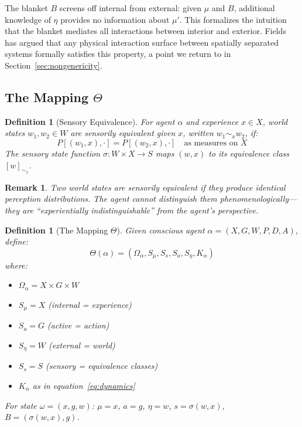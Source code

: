 \documentclass[11pt,a4paper]{article}
\newtheorem{definition}[theorem]{Definition}
\newtheorem*{remark}{Remark}
\begin{document}
The blanket $B$ screens off internal from external: given $\mu$ and $B$, additional knowledge of $\eta$ provides no information about $\mu'$. This formalizes the intuition that the blanket mediates all interactions between interior and exterior. Fields \cite{fields2019} has argued that any physical interaction surface between spatially separated systems formally satisfies this property, a point we return to in Section~\ref{sec:nongenericity}.

\subsection{The Mapping $\Theta$}

\begin{definition}[Sensory Equivalence]\label{def:sensory-equiv}
For agent $\alpha$ and experience $x \in X$, world states $w_1, w_2 \in W$ are \emph{sensorily equivalent given $x$}, written $w_1 \sim_x w_2$, if:
\[
P[(w_1, x), \cdot] = P[(w_2, x), \cdot] \quad \text{as measures on } X
\]
The \emph{sensory state function} $\sigma : W \times X \to S$ maps $(w, x)$ to its equivalence class $[w]_{\sim_x}$.
\end{definition}

\begin{remark}
Two world states are sensorily equivalent if they produce identical perception distributions. The agent cannot distinguish them phenomenologically---they are ``experientially indistinguishable'' from the agent's perspective.
\end{remark}

\begin{definition}[The Mapping $\Theta$]\label{def:theta}
Given conscious agent $\alpha = (X, G, W, P, D, A)$, define:
\[
\Theta(\alpha) = (\Omega_\alpha, S_\mu, S_s, S_a, S_\eta, K_\alpha)
\]
where:
\begin{itemize}[nosep]
    \item $\Omega_\alpha = X \times G \times W$
    \item $S_\mu = X$ (internal = experience)
    \item $S_a = G$ (active = action)
    \item $S_\eta = W$ (external = world)
    \item $S_s = S$ (sensory = equivalence classes)
    \item $K_\alpha$ as in equation~\eqref{eq:dynamics}
\end{itemize}
For state $\omega = (x, g, w)$: $\mu = x$, $a = g$, $\eta = w$, $s = \sigma(w, x)$, $B = (\sigma(w, x), g)$.
\end{definition}
\end{document}
